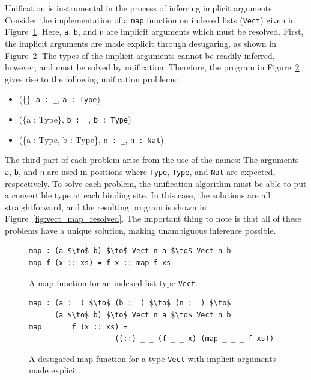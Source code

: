 Unification is instrumental in the process of inferring implicit
arguments. Consider the implementation of a \texttt{map} function on indexed
lists (\texttt{Vect}) given in Figure~\ref{fig:vect_map}. Here, \texttt{a},
\texttt{b}, and \texttt{n} are implicit arguments which must be resolved. First,
the implicit arguments are made explicit through desugaring, as shown in
Figure~\ref{fig:vect_map_desugared}. The types of the implicit arguments cannot
be readily inferred, however, and must be solved by unification. Therefore, the
program in Figure~\ref{fig:vect_map_desugared} gives rise to the following
unification problems:
\begin{itemize}
\item (\{\}, \texttt{a : \_}, \texttt{a : Type})
\item (\{a : Type\}, \texttt{b : \_}, \texttt{b : Type})
\item (\{a : Type, b : Type\}, \texttt{n : \_}, \texttt{n : Nat})
\end{itemize}
The third part of each problem arise from the use of the names: The arguments
\texttt{a}, \texttt{b}, and \texttt{n} are used in positions where
\texttt{Type}, \texttt{Type}, and \texttt{Nat} are expected, respectively. To
solve each problem, the unification algorithm must be able to put a convertible
type at each binding site. In this case, the solutions are all straightforward,
and the resulting program is shown in Figure~\ref{fig:vect_map_resolved}. The
important thing to note is that all of these problems have a unique solution,
making unambiguous inference possible.

\begin{figure}
\begin{lstlisting}[mathescape]
map : (a $\to$ b) $\to$ Vect n a $\to$ Vect n b
map f (x :: xs) = f x :: map f xs
\end{lstlisting}
  \caption{A map function for an indexed list type \texttt{Vect}.}
  \label{fig:vect_map}
\end{figure}

\begin{figure}
\begin{lstlisting}[mathescape]
map : (a : _) $\to$ (b : _) $\to$ (n : _) $\to$ 
      (a $\to$ b) $\to$ Vect n a $\to$ Vect n b
map _ _ _ f (x :: xs) = 
                    ((::) _ _ (f _ _ x) (map _ _ _ f xs))
\end{lstlisting}
  \caption{A desugared map function for a type \texttt{Vect} with implicit
    arguments made explicit.}
  \label{fig:vect_map_desugared}
\end{figure}

